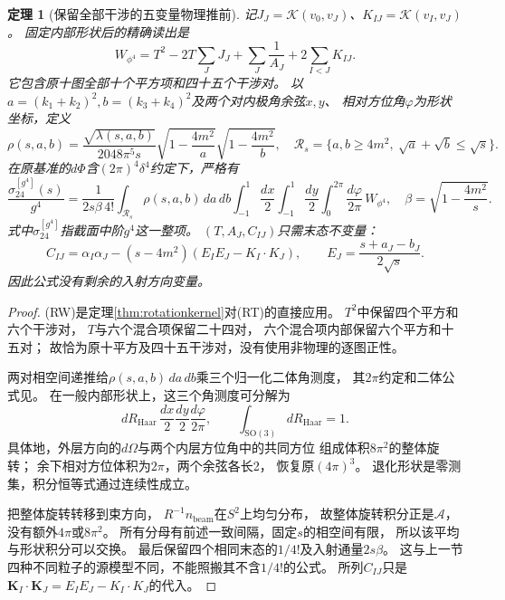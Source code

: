 \documentclass[11pt,a4paper]{ctexart}
\theoremstyle{cnplain}\newtheorem{theorem}{定理}[section]
\theoremstyle{definition}\newtheorem{definition}[theorem]{定义}
\theoremstyle{remark}\newtheorem{remark}[theorem]{注}
\begin{document}
\begin{theorem}[保留全部干涉的五变量物理推前]\label{thm:rotationfullrate}
记$J_J=\mathcal K(v_0,v_J)$、$K_{IJ}=\mathcal K(v_I,v_J)$。
固定内部形状后的精确读出是
\[
 W_{\phi^4}
 =T^2-2T\sum_J J_J+\sum_J\frac1{A_J}
       +2\sum_{I<J}K_{IJ}.
 \tag{RW}\label{eq:rotationweight}
\]
它包含原十图全部十个平方项和四十五个干涉对。
以$a=(k_1+k_2)^2,b=(k_3+k_4)^2$及两个对内极角余弦$x,y$、
相对方位角$\varphi$为形状坐标，定义
\[
 \rho(s,a,b)=\frac{\sqrt{\lambda(s,a,b)}}{2048\pi^5s}
              \sqrt{1-\frac{4m^2}{a}}\sqrt{1-\frac{4m^2}{b}},
 \quad
 \mathcal R_s=\{a,b\ge4m^2,\ \sqrt a+\sqrt b\le\sqrt s\}.
\]
在原基准的$d\Phi$含$(2\pi)^4\delta^4$约定下，严格有
\[
 \frac{\sigma_{24}^{[g^4]}(s)}{g^4}
 =\frac1{2s\beta\,4!}\int_{\mathcal R_s}\rho(s,a,b)\,da\,db
  \int_{-1}^1\frac{dx}{2}\int_{-1}^1\frac{dy}{2}
  \int_0^{2\pi}\frac{d\varphi}{2\pi}\,W_{\phi^4},
 \quad \beta=\sqrt{1-\frac{4m^2}s}.
 \tag{RF}\label{eq:rotationrate}
\]
式中$\sigma_{24}^{[g^4]}$指截面中阶$g^4$这一整项。
$(T,A_J,C_{IJ})$只需末态不变量：
\[
 C_{IJ}=\alpha_I\alpha_J
 -(s-4m^2)(E_I E_J-K_I\cdot K_J),\qquad
 E_J=\frac{s+a_J-b_J}{2\sqrt s}.
\]
因此公式没有剩余的入射方向变量。
\end{theorem}
\begin{proof}
(RW)是定理\ref{thm:rotationkernel}对(RT)的直接应用。
$T^2$中保留四个平方和六个干涉对，
$T$与六个混合项保留二十四对，
六个混合项内部保留六个平方和十五对；
故恰为原十平方及四十五干涉对，没有使用非物理的逐图正性。

两对相空间递推给$\rho(s,a,b)\,da\,db$乘三个归一化二体角测度，
其$2\pi$约定和二体公式见\cite[式(49.12)--(49.18)]{PDGphase}。
在一般内部形状上，这三个角测度可分解为
\[
 dR_{\mathrm{Haar}}\,
 \frac{dx}{2}\frac{dy}{2}\frac{d\varphi}{2\pi},
 \qquad \int_{\mathrm{SO}(3)}dR_{\mathrm{Haar}}=1.
\]
具体地，外层方向的$d\Omega$与两个内层方位角中的共同方位
组成体积$8\pi^2$的整体旋转；
余下相对方位体积为$2\pi$，两个余弦各长2，
恢复原$(4\pi)^3$。
退化形状是零测集，积分恒等式通过连续性成立。

把整体旋转转移到束方向，
$R^{-1}n_{\mathrm{beam}}$在$S^2$上均匀分布，
故整体旋转积分正是$\mathcal A$，没有额外$4\pi$或$8\pi^2$。
所有分母有前述一致间隔，固定$s$的相空间有限，
所以该平均与形状积分可以交换。
最后保留四个相同末态的$1/4!$及入射通量$2s\beta$。
这与上一节四种不同粒子的源模型不同，不能照搬其不含$1/4!$的公式。
所列$C_{IJ}$只是$\mathbf K_I\cdot\mathbf K_J=E_I E_J-K_I\cdot K_J$的代入。
\end{proof}
\end{document}
